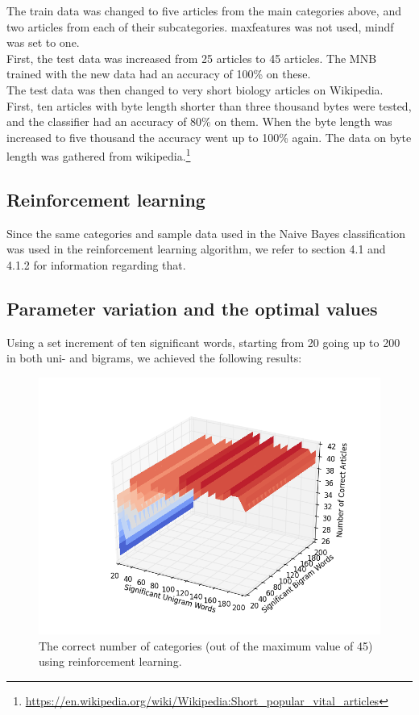 \documentclass[a4paper,10pt]{article}
\begin{document}
\noindent The train data was changed to five articles from the main categories above, and two articles from each of their subcategories. max\textunderscore features was not used, min\textunderscore df was set to one.\\

\noindent First, the test data was increased from 25 articles to 45 articles. The MNB trained with the new data had an accuracy of 100\% on these.\\

\noindent The test data was then changed to very short biology articles on Wikipedia. First, ten articles with byte length shorter than three thousand bytes were tested, and the classifier had an accuracy of 80\% on them. When the byte length was increased to five thousand the accuracy went up to 100\% again.
\noindent The data on byte length was gathered from wikipedia.\footnote{\url{https://en.wikipedia.org/wiki/Wikipedia:Short_popular_vital_articles}}

\subsection{Reinforcement learning}
Since the same categories and sample data used in the Naive Bayes classification was used in the reinforcement learning algorithm, we refer to section 4.1 and 4.1.2 for information regarding that.

\subsection{Parameter variation and the optimal values}
Using a set increment of ten significant words, starting from 20 going up to 200 in both uni- and bigrams, we achieved the following results:

\begin{figure}[h!]
  \centering
    \includegraphics[width=1.0\textwidth]{reinforcement_plot.png}
  \caption{The correct number of categories (out of the maximum value of 45) using reinforcement learning.}
  \label{fig:reinforcement_plot}
\end{figure}
\end{document}
